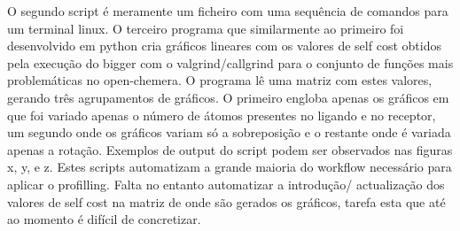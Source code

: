 O segundo script é meramente um ficheiro com uma sequência de comandos para um terminal linux. O terceiro programa que similarmente ao primeiro foi desenvolvido em python cria gráficos lineares com os valores de self cost obtidos pela execução do bigger com o valgrind/callgrind para o conjunto de funções mais problemáticas no open-chemera. O programa lê uma matriz com estes valores, gerando três agrupamentos de gráficos. O primeiro engloba apenas os gráficos em que foi variado apenas o número de átomos presentes no ligando e no receptor, um segundo onde os gráficos variam só a sobreposição e o restante onde é variada apenas a rotação. Exemplos de output do script podem ser observados nas figuras x, y, e z.
Estes scripts automatizam a grande maioria do workflow necessário para aplicar o profilling. Falta no entanto automatizar a introdução/ actualização dos valores de self cost na matriz de onde são gerados os gráficos, tarefa esta que até ao momento é difícil de concretizar. 

